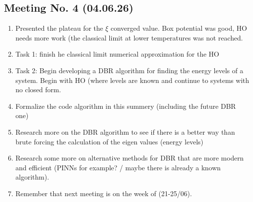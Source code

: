 \documentclass{article}
\numberwithin{equation}{subsection}
\begin{document}
\subsection*{Meeting No. 4 (04.06.26)}
\begin{enumerate}[label=\textbf{\Alph*.}]
    \item Presented the plateau for the $\xi$ converged value. Box potential was good, HO needs more work (the classical limit at lower temperatures was not reached.

    \item Task 1: finish he classical limit numerical approximation for the HO

    \item Task 2: Begin developing a DBR algorithm for finding the energy levels of a system. Begin with HO (where levels are known and continue to systems with no closed form. 

    \item Formalize the code algorithm in this summery (including the future DBR one)

    \item Research more on the DBR algorithm to see if there is a better way than brute forcing the calculation of the eigen values (energy levels)

    \item Research some more on alternative methods for DBR that are more modern and efficient (PINNs for example? / maybe there is already a known algorithm).

    \item Remember that next meeting is on the week of (21-25/06).
\end{enumerate}
\end{document}
